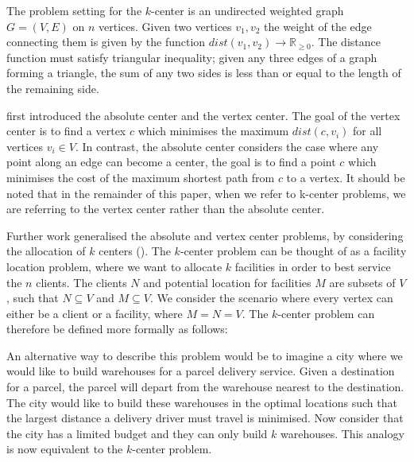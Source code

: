 The problem setting for the $k$-center is an undirected weighted graph $G=(V,E)$ on $n$ vertices. Given two vertices $v_1, v_2$ the weight of the edge connecting them is given by the function $dist(v_1,v_2)\rightarrow\mathbb{R}_{\ge 0}$. The distance function must satisfy triangular inequality; given any three edges of a graph forming a triangle, the sum of any two sides is less than or equal to the length of the remaining side.

\textcite{hakimi_optimum_1964} first introduced the absolute center and the vertex center. The goal of the vertex center is to find a vertex $c$ which minimises the maximum $dist(c, v_i)$ for all vertices $v_i\in V$. In contrast, the absolute center considers the case where any point along an edge can become a center, the goal is to find a point $c$ which minimises the cost of the maximum shortest path from $c$ to a vertex. It should be noted that in the remainder of this paper, when we refer to k-center problems, we are referring to the vertex center rather than the absolute center.

Further work generalised the absolute and vertex center problems, by considering the allocation of $k$ centers (\cite{hakimi_optimum_1965}). The $k$-center problem can be thought of as a facility location problem, where we want to allocate $k$ facilities in order to best service the $n$ clients. The clients $N$ and potential location for facilities $M$ are subsets of $V$, such that $N\subseteq V$ and $M\subseteq V$. We consider the scenario where every vertex can either be a client or a facility, where $M=N=V$. The $k$-center problem can therefore be defined more formally as follows:


An alternative way to describe this problem would be to imagine a city where we would like to build warehouses for a parcel delivery service. Given a destination for a parcel, the parcel will depart from the warehouse nearest to the destination. The city would like to build these warehouses in the optimal locations such that the largest distance a delivery driver must travel is minimised. Now consider that the city has a limited budget and they can only build $k$ warehouses. This analogy is now equivalent to the $k$-center problem.

